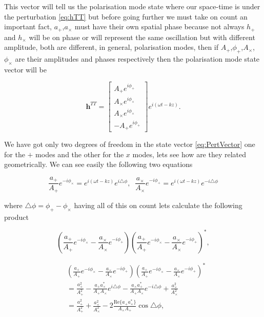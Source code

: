             This vector will tell us the polarisation mode state where our space-time is under the perturbation \ref{eq:hTT} but before going further we must take on count an important fact, $a_+$,$a_{\times}$ must have their own spatial phase because not always $h_+$ and $h_{\times}$ will be on phase or will represent the same oscillation but with different amplitude, both are different, in general, polarisation modes, then if $A_+$,$\phi_+$,$A_{\times}$,$\phi_{\times}$ are their amplitudes and phases respectively then the polarisation mode state vector will be

            \begin{equation}\label{eq:PertVector}
                \textbf{h}^{TT} =
                \begin{bmatrix}
                    A_+e^{i\phi_+}\\
                    A_{\times}e^{i\phi_{\times}}\\
                    A_{\times}e^{i\phi_{\times}}\\
                    -A_+e^{i\phi_+}
                \end{bmatrix}e^{i\left(\omega t - kz \right)}.
            \end{equation}

            We have got only two degrees of freedom in the state vector \ref{eq:PertVector} one for the $+$ modes and the other for the $x$ modes, lets see how are they related geometrically. We can see easily the following two equations

            \begin{equation}
                \frac{a_+}{A_+}e^{-i\phi_{\times}} = e^{i\left(\omega t -kz \right)}e^{i\triangle\phi},\;\; \frac{a_{\times}}{A_{\times}}e^{-i\phi_{+}} = e^{i\left(\omega t - kz\right)}e^{-i\triangle \phi}
            \end{equation}

            where $\triangle\phi = \phi_+ - \phi_{\times}$ having all of this on count lets calculate the following product

            \begin{equation}
                \left(\frac{a_+}{A_+}e^{-i\phi_{\times}}-  \frac{a_{\times}}{A_{\times}}e^{-i\phi_+}\right)\left(\frac{a_+}{A_+}e^{-i\phi_{\times}}-  \frac{a_{\times}}{A_{\times}}e^{-i\phi_+}\right)^*,
            \end{equation}

            \begin{align*}
                &\left(\frac{a_+}{A_+}e^{-i\phi_{\times}}-  \frac{a_{\times}}{A_{\times}}e^{-i\phi_+}\right)\left(\frac{a_+}{A_+}e^{-i\phi_{\times}}-  \frac{a_{\times}}{A_{\times}}e^{-i\phi_+}\right)^*\\
                &= \frac{a_+^2}{A_+^2} - \frac{a_+a_{\times}^*}{A_+A_{\times}}e^{i\triangle\phi} - \frac{a_{\times}a_+^*}{A_+A_{\times}}e^{-i\triangle\phi} + \frac{a_{\times}^2}{A_{\times}^2}\\
                &= \frac{a_+^2}{A_+^2} + \frac{a_{\times}^2}{A_{\times}^2} - 2\frac{\mathrm{Re}\{a_+a_{\times}^*\}}{A_{\times}A_+}\cos\triangle\phi,
            \end{align*}

